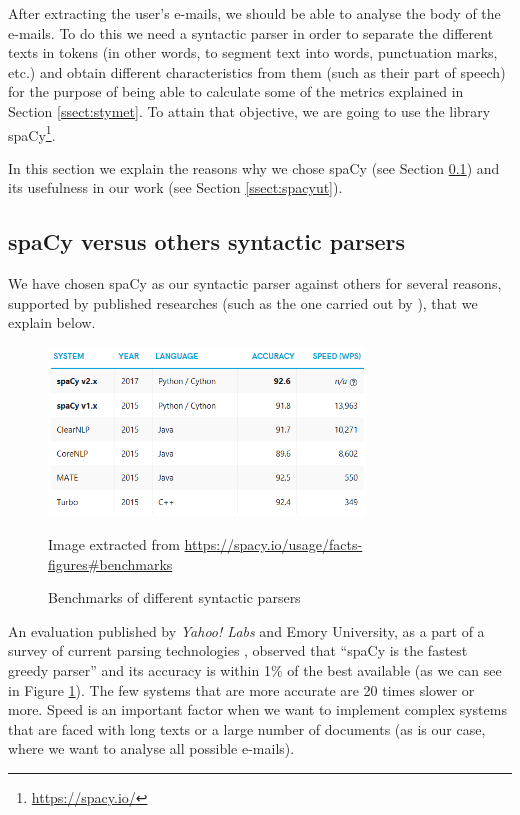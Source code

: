 After extracting the user's e-mails, we should be able to analyse the body of the e-mails. To do this we need a syntactic parser in order to separate the different texts in tokens (in other words, to segment text into words, punctuation marks, etc.) and obtain different characteristics from them (such as their part of speech) for the purpose of being able to calculate some of the metrics explained in Section \ref{ssect:stymet}. To attain that objective, we are going to use the library spaCy\footnote{\url{https://spacy.io/}}.

In this section we explain the reasons why we chose spaCy (see Section \ref{ssect:spacywhy}) and its usefulness in our work (see Section \ref{ssect:spacyut}).

\subsection{spaCy versus others syntactic parsers}\label{ssect:spacywhy}

We have chosen spaCy as our syntactic parser against others for several reasons, supported by published researches (such as the one carried out by \cite{choi2015depends}), that we explain below.

\begin{figure}[h]
	\centering%
	\includegraphics[width = 0.75\textwidth]{Imagenes/Bitmap/Spacy/spacyeval.png}%
	\caption{Benchmarks of different syntactic parsers}%
	Image extracted from \url{https://spacy.io/usage/facts-figures#benchmarks}
	\label{fig:spacyeval}
\end{figure}

An evaluation published by \textit{Yahoo! Labs} and Emory University, as a part of a survey of current parsing technologies \citep{choi2015depends}, observed that ``spaCy is the fastest greedy parser'' and its accuracy is within 1\% of the best available (as we can see in Figure \ref{fig:spacyeval}). The few systems that are more accurate are 20 times slower or more. Speed is an important factor when we want to implement complex systems that are faced with long texts or a large number of documents (as is our case, where we want to analyse all possible e-mails).

